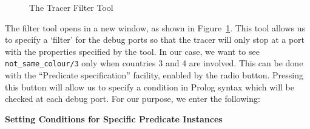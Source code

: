 \begin{figure}
\begin{center}
\end{center}
\caption{The Tracer Filter Tool}
\label{tkfilter}
\end{figure}

The filter tool opens in a new window, as shown in
Figure~\ref{tkfilter}. This tool allows us to specify a `filter' for the
debug ports so that the tracer will only stop at a port with the properties
specified by the tool. In our case, we want to see \verb'not_same_colour/3'
only when countries 3 and 4 are involved. This can be done 
with the ``Predicate specification'' facility, enabled by the
 radio button. Pressing this button
will allow us to specify a condition in Prolog syntax which will be
checked at each debug port. For our purpose, we enter the following:

\begin{center}

\vspace{3mm}
{\bf Setting Conditions for Specific Predicate Instances}
\end{center}

